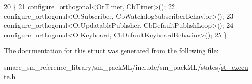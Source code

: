 \begin{DoxyCode}
20     \{
21         configure\_orthogonal<OrTimer, CbTimer>();
22         configure\_orthogonal<OrSubscriber, CbWatchdogSubscriberBehavior>();
23         configure\_orthogonal<OrUpdatablePublisher, CbDefaultPublishLoop>();
24         configure\_orthogonal<OrKeyboard, CbDefaultKeyboardBehavior>();
25     \}
\end{DoxyCode}


The documentation for this struct was generated from the following file\+:\begin{DoxyCompactItemize}
\item 
smacc\+\_\+sm\+\_\+reference\+\_\+library/sm\+\_\+pack\+M\+L/include/sm\+\_\+pack\+M\+L/states/\hyperlink{st__execute_8h}{st\+\_\+execute.\+h}\end{DoxyCompactItemize}
